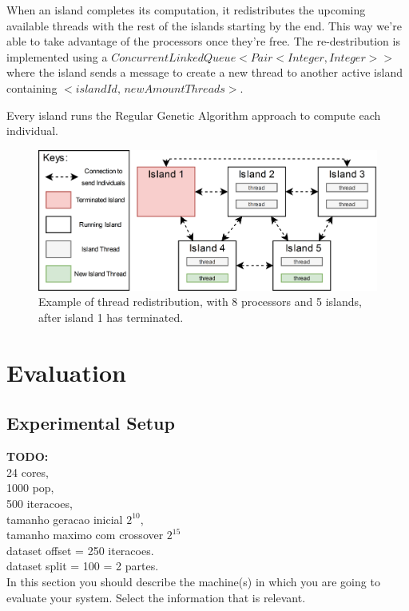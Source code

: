 \documentclass[runningheads]{llncs}
\begin{document}
When an island completes its computation, it redistributes the upcoming available threads with the rest of the islands starting by the end. This way we're able to take advantage of the processors once they're free. The re-destribution is implemented using a \(ConcurrentLinkedQueue<Pair<Integer, Integer>>\) where the island sends a message to create a new thread to another active island containing \(<islandId, \,newAmountThreads>\).

Every island runs the Regular Genetic Algorithm approach to compute each individual.

\begin{figure}[htbp]
\centering
\includegraphics[width=.92\textwidth]{IslandModel.png}
\caption{Example of thread redistribution, with 8 processors and 5 islands, after island 1 has terminated.} \label{islandDiagram}
\end{figure}


\section{Evaluation}

\subsection{Experimental Setup}
\textbf{TODO:} \\
24 cores, \\ 1000 pop,\\  500 iteracoes, \\ 
tamanho geracao inicial \(2^{10}\), \\ 
tamanho maximo com crossover \(2^{15}\) \\
dataset offset = 250 iteracoes. \\
dataset split = 100 = 2 partes. \\

In this section you should describe the machine(s) in which you are going to evaluate your system. Select the information that is relevant.
\end{document}
